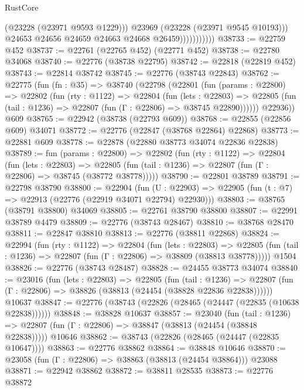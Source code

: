 \begin{lexlean}{RustCore}
\begin{coremodule}
                              (@23228 (@23971 @9593 @1229)))
                            @23969
                            (@23228 (@23971 @9545 @10193)))
                          @24653
                          @24656
                          @24659
                          @24663
                          @24668
                          @26459)))))))))))
@38733 := @22759 @452
@38737 := @22761 (@22765 @452) (@22771 @452)
@38738 := @22780 @34068
@38740 := @22776 (@38738 @22795)
@38742 := @22818 (@22819 @452)
@38743 := @22814 @38742
@38745 := @22776 (@38743 @22843)
@38762 := @22775
    (fun (fn : @35) =>
    @38740
      (@22798
        (@22801
          (fun (params : @22800) =>
          @22802
            (fun (rty : @1122) =>
            @22804
              (fun (lets : @22803) =>
              @22805 (fun (tail : @1236) => @22807 (fun (Γ : @22806) => @38745 @22890))))))
        @22936))
    @609
@38765 := @22942 (@38738 (@22793 @609))
@38768 := @22855 (@22856 @609) @34071
@38772 := @22776 (@22847 (@38768 @22864) @22868)
@38773 := @22881 @609
@38778 := @22878 (@22880 @38773 @34074 @22836 @22838)
@38789 := fun (params : @22800) =>
  @22802
    (fun (rty : @1122) =>
    @22804
      (fun (lets : @22803) =>
      @22805 (fun (tail : @1236) => @22807 (fun (Γ : @22806) => @38745 (@38772 @38778)))))
@38790 := @22801 @38789
@38791 := @22798 @38790
@38800 := @22904
    (fun (U : @22903) => @22905 (fun (t : @7) => @22913 (@22776 (@22919 @34071 @22794) @22930)))
@38803 := @38765 (@38791 @38800) @34069
@38805 := @22761 @38790 @38800
@38807 := @22991 @38789 @4479
@38809 := @22776 (@38743 @28467)
@38810 := @38768 @28470
@38811 := @22847 @38810
@38813 := @22776 (@38811 @22868)
@38824 := @22994
    (fun (rty : @1122) =>
    @22804
      (fun (lets : @22803) =>
      @22805 (fun (tail : @1236) => @22807 (fun (Γ : @22806) => @38809 (@38813 @38778)))))
    @1504
@38826 := @22776 (@38743 @28487)
@38828 := @24455 @38773 @34074
@38840 := @23016
    (fun (lets : @22803) =>
    @22805
      (fun (tail : @1236) =>
      @22807 (fun (Γ : @22806) => @38826 (@38813 (@24454 (@38828 @22836 @22838))))))
    @10637
@38847 := @22776 (@38743 (@22826 (@28465 (@24447 (@22835 (@10638 @22838))))))
@38848 := @38828 @10637
@38857 := @23040
    (fun (tail : @1236) => @22807 (fun (Γ : @22806) => @38847 (@38813 (@24454 (@38848 @22838)))))
    @10646
@38862 := @38743 (@22826 (@28465 (@24447 (@22835 @10647))))
@38863 := @22776 @38862
@38864 := @38848 @10646
@38870 := @23058 (fun (Γ : @22806) => @38863 (@38813 (@24454 @38864))) @23088
@38871 := @22942 @38862
@38872 := @38811 @28535
@38873 := @22776 @38872

\end{coremodule}
\end{lexlean}

